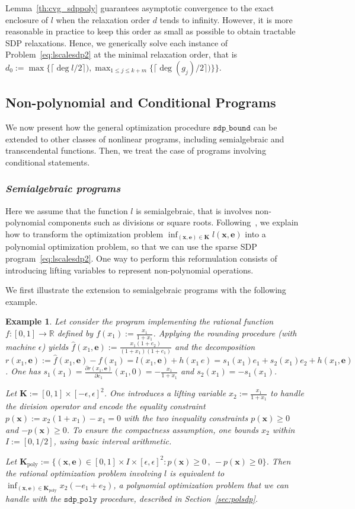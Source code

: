 \documentclass[preprint]{sigplanconf}
\newcommand{\R}{\mathbb{R}}
\newcommand{\x}{\mathbf{x}}
\newcommand{\e}{\mathbf{e}}
\def\K{\mathbf{K}}
\newcommand{\Kpol}{\K_{\text{poly}}}
\newcommand{\sdpbound}{\mathtt{sdp\_bound}}
\newcommand{\sdppoly}{\mathtt{sdp\_poly}}
\theoremstyle{plain}
\newtheorem{example}{Example}
\begin{document}
%
Lemma~\ref{th:cvg_sdppoly} guarantees asymptotic convergence to the exact enclosure of $l$ when the relaxation order $d$ tends to infinity. However, it is more reasonable in practice to keep this order as small as possible to obtain tractable SDP relaxations. Hence, we generically solve each instance of Problem~\eqref{eq:lscalesdp2} at the minimal relaxation order, that is $d_0 := \max \{\lceil \deg l / 2\rceil) , \max_{1 \leq j \leq k+m} \{ \lceil \deg (g_j) / 2\rceil) \} \}$. 
%
\subsection{Non-polynomial and Conditional Programs}
\label{sec:nonpolsdp}
We now present how the general optimization procedure $\sdpbound$ can be extended to other classes of nonlinear programs, including semialgebraic and transcendental functions. Then, we treat the case of programs involving conditional statements.
%
\subsubsection*{\textit{Semialgebraic programs}} 
Here we assume that the function $l$ is semialgebraic, that is involves non-polynomial components such as divisions or square roots.
Following~\cite{LasPut10}, we explain how to transform the optimization problem $\inf_{(\x,\e) \in \K} l (\x, \e)$ into a polynomial optimization problem, so that we can use the sparse SDP program~\eqref{eq:lscalesdp2}. One way to perform this reformulation consists of introducing lifting variables to represent non-polynomial operations.

We first illustrate the extension to semialgebraic programs with the following example.
\begin{example}
Let consider the program implementing the rational function $f : [0, 1] \to \R$ defined by $f(x_1) := \frac{x_1}{1 + x_1}$. Applying the rounding procedure (with machine $\epsilon$) yields $\hat{f}(x_1,\e) := \frac{x _1(1 + e_2)}{(1 + x_1)(1 + e_1)}$ and the decomposition $r(x_1, \e) := \hat{f}(x_1,\e) - f(x_1) = l(x_1,\e) + h(x_1\,e) = s_1 (x_1) e_1 + s_2 (x_1) e_2 + h(x_1,\e)$. One has $s_1(x_1) = \frac{\partial r(x_1,\e)} {\partial e_1} (x_1,0) = -\frac{x_1}{1 + x_1}$ and $s_2(x_1) = - s_1(x_1)$.

Let $\K := [0, 1] \times [-\epsilon, \epsilon]^2$. One introduces a lifting variable $x_2 := \frac{x_1}{1 + x_1}$ to handle the division operator and encode the equality constraint $p(\x) :=  x_2 (1 + x_1) - x_1 = 0$ with the two inequality constraints $p (\x) \geq 0$ and $-p(\x) \geq 0$. To ensure the compactness assumption, one bounds $x_2$ within $I := [0, 1/2]$, using basic interval arithmetic.

Let $\Kpol := \{(\x,\e) \in [0, 1] \times I \times [\epsilon, \epsilon]^2 : p(\x) \geq 0 \,,\  - p(\x) \geq 0 \}$. Then the rational optimization problem involving $l$ is equivalent to $\inf_{(\x,\e) \in \Kpol} x_2 (-e_1 + e_2)$, a polynomial optimization problem that we can handle with the $\sdppoly$ procedure, described in Section~\ref{sec:polsdp}.
\end{example}
%
\end{document}

